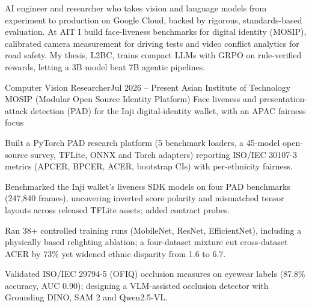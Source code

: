 \documentclass{aicv}
\begin{document}
\makecvheader

AI engineer and researcher who takes vision and language models from experiment to production on Google Cloud, backed
by rigorous, standards-based evaluation. At AIT I build face-liveness benchmarks for digital identity (MOSIP), calibrated
camera measurement for driving tests and video conflict analytics for road safety. My thesis, L2BC, trains compact LLMs
with GRPO on rule-verified rewards, letting a 3B model beat 7B agentic pipelines.


\begin{cventry}{Computer Vision Researcher}{Jul 2026 -- Present}
  {Asian Institute of Technology \textperiodcentered{} MOSIP (Modular Open Source Identity Platform)}
  {Face liveness and presentation-attack detection (PAD) for the Inji digital-identity wallet, with an APAC fairness focus}
  \item Built a PyTorch PAD research platform (5 benchmark loaders, a 45-model open-source survey, TFLite, ONNX and Torch
    adapters) reporting ISO/IEC 30107-3 metrics (APCER, BPCER, ACER, bootstrap CIs) with per-ethnicity fairness.
  \item Benchmarked the Inji wallet's liveness SDK models on four PAD benchmarks (247,840 frames), uncovering
    inverted score polarity and mismatched tensor layouts across released TFLite assets; added contract probes.
  \item Ran 38+ controlled training runs (MobileNet, ResNet, EfficientNet), including a physically based relighting ablation;
    a four-dataset mixture cut cross-dataset ACER by 73\% yet widened ethnic disparity from 1.6\texttimes{} to 6.7\texttimes.
  \item Validated ISO/IEC 29794-5 (OFIQ) occlusion measures on eyewear labels (87.8\% accuracy, AUC 0.90); designing a
    VLM-assisted occlusion detector with Grounding DINO, SAM 2 and Qwen2.5-VL.
\end{cventry}
\end{document}
